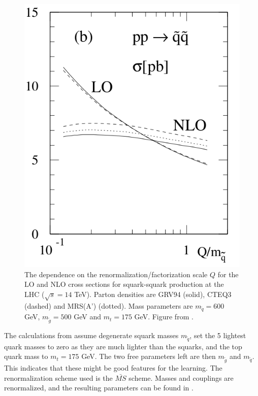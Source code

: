 \documentclass[twoside,english]{uiofysmaster}
\begin{document}
\begin{figure}
\centering
\includegraphics[scale=0.4]{squark_gluino_LO_NLO.png}
\caption{The dependence on the renormalization/factorization scale $Q$ for the LO and NLO cross sections for squark-squark production at the LHC ($\sqrt{s}=14$ TeV). Parton densities are GRV94 (solid), CTEQ3 (dashed) and MRS(A') (dotted). Mass parameters are $m_{\tilde{q}}=600$ GeV, $m_{\tilde{g}}=500$ GeV and $m_t=175$ GeV. Figure from \cite{beenakker1997squark}.}
\label{Fig:: hadron susy : LO vs NLO beenakker}
\end{figure}


The calculations from \cite{beenakker1997squark} assume degenerate squark masses $m_{\tilde{q}}$, set the 5 lightest quark masses to zero as they are much lighter than the squarks, and the top quark mass to $m_t =175$ GeV. The two free parameters left are then $m_{\tilde{g}}$ and $m_{\tilde{q}}$. This indicates that these might be good features for the learning. The renormalization scheme used is the $\bar{MS}$ scheme. Masses and couplings are renormalized, and the resulting parameters can be found in \cite{beenakker1997squark}.
\end{document}
